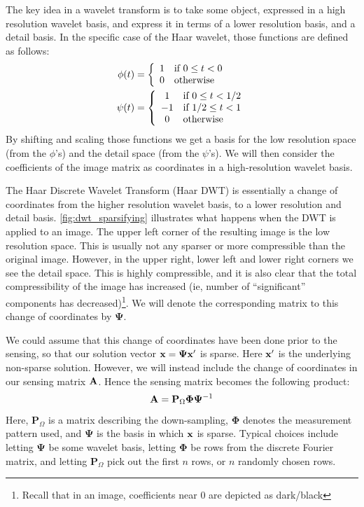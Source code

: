 The key idea in a wavelet transform is to take some object, expressed in a high resolution wavelet basis, and express it in terms of a lower resolution basis, and a detail basis. In the specific case of the Haar wavelet, those functions are defined as follows:
\begin{align*}
	\phi(t) &= \left\{ \begin{array}{cl} 1 & \text{if } 0\leq t < 0 \\ 0 & \text{otherwise} \end{array} \right. \\
	\psi(t) &= \left\{ \begin{array}{cl} 1 & \text{if } 0\leq t < 1/2 \\ -1 & \text{if } 1/2 \leq t < 1 \\ 0 & \text{otherwise} \end{array} \right.
\end{align*}
By shifting and scaling those functions we get a basis for the low resolution space (from the $ \phi $'s) and the detail space (from the $ \psi $'s). We will then consider the coefficients of the image matrix as coordinates in a high-resolution wavelet basis. 

The Haar Discrete Wavelet Transform (Haar DWT) is essentially a change of coordinates from the higher resolution wavelet basis, to a lower resolution and detail basis. \cref{fig:dwt_sparsifying} illustrates what happens when the DWT is applied to an image. The upper left corner of the resulting image is the low resolution space. This is usually not any sparser or more compressible than the original image. However, in the upper right, lower left and lower right corners we see the detail space. This is highly compressible, and it is also clear that the total compressibility of the image has increased (ie, number of ``significant'' components has decreased)\footnote{Recall that in an image, coefficients near $ 0 $ are depicted as dark/black}. We will denote the corresponding matrix to this change of coordinates by $ \mathbf{\Psi} $. 



We could assume that this change of coordinates have been done prior to the sensing, so that our solution vector $ \mathbf{x} = \mathbf{\Psi}\mathbf{x}' $ is sparse. Here $ \mathbf{x}' $ is the underlying non-sparse solution. However, we will instead include the change of coordinates in our sensing matrix $ \mathbf{A} $. Hence the sensing matrix becomes the following product:
\begin{equation}
	\label{eq:sensingmatrix_composition}
	\mathbf{A} = \mathbf{P}_{\Omega}\mathbf{\Phi}\mathbf{\Psi}^{-1}
\end{equation}
Here, $ \mathbf{P}_{\Omega} $ is a matrix describing the down-sampling, $ \mathbf{\Phi} $ denotes the measurement pattern used, and $ \mathbf{\Psi} $ is the basis in which $ \mathbf{x} $ is sparse. Typical choices include letting $ \mathbf{\Psi} $ be some wavelet basis, letting $ \mathbf{\Phi} $ be rows from the discrete Fourier matrix, and letting $ \mathbf{P}_{\Omega} $ pick out the first $ n $ rows, or $ n $ randomly chosen rows. 

